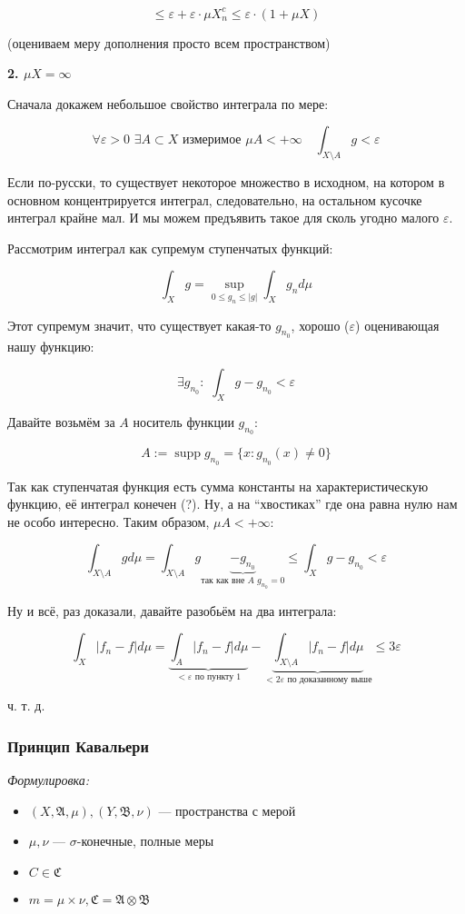 \documentclass{article}
\def\dbl{\,\,}
\DeclareMathOperator{\supp}{supp}
\begin{document}
\[\le \varepsilon + \varepsilon \cdot \mu X_n^c \le \varepsilon \cdot (1 + \mu X)\]

(оцениваем меру дополнения просто всем пространством)

\textbf{2. $\mu X = \infty$}

Сначала докажем небольшое свойство интеграла по мере:

\[\forall \varepsilon > 0 \dbl \exists A \subset X \text{ измеримое } \mu A < + \infty \quad \int_{X \setminus A} g < \varepsilon\]

Если по-русски, то существует некоторое множество в исходном, на котором в основном концентрируется интеграл, следовательно, на остальном кусочке интеграл крайне мал. И мы можем предъявить такое для сколь угодно малого $\varepsilon$.

Рассмотрим интеграл как супремум ступенчатых функций:

\[\int_{X} g = \sup_{0 \le g_n \le |g|} \int_{X} g_n d\mu\]

Этот супремум значит, что существует какая-то $g_{n_0}$, хорошо ($\varepsilon$) оценивающая нашу функцию:

\[\exists g_{n_0}: \dbl \int_{X} g - g_{n_0} < \varepsilon\]

Давайте возьмём за $A$ носитель функции $g_{n_0}$:

\[A := \supp g_{n_0} = \{x: g_{n_0}(x) \neq 0\}\]

Так как ступенчатая функция есть сумма константы на характеристическую функцию, её интеграл конечен (?). Ну, а на ``хвостиках'' где она равна нулю нам не особо интересно. Таким образом, $\mu A < + \infty$:

\[\int_{X \setminus A} g d\mu = \int_{X \setminus A} g \underbrace{- g_{n_0}}_{\text{так как вне } A \,\, g_{n_0} = 0} \le \int_{X} g - g_{n_0} < \varepsilon\]

Ну и всё, раз доказали, давайте разобьём на два интеграла:

\[\int_{X} |f_n - f| d\mu = \underbrace{\int_{A} |f_n - f| d\mu}_{< \varepsilon \text{ по пункту 1}} - \underbrace{\int_{X \setminus A} |f_n - f| d\mu}_{<2 \varepsilon \text{ по доказанному выше}} \le 3 \varepsilon\]

ч. т. д. 

\subsubsection{Принцип Кавальери}
\textit{Формулировка:}

\begin{itemize}
    \item $(X, \mathfrak{A}, \mu), (Y, \mathfrak{B}, \nu)$ --- пространства с мерой
    \item $\mu, \nu$ --- $\sigma$-конечные, полные меры
    \item $C \in \mathfrak{C}$
    \item $m = \mu \times \nu, \mathfrak{C} = \mathfrak{A} \otimes \mathfrak{B}$
\end{itemize}
\end{document}
